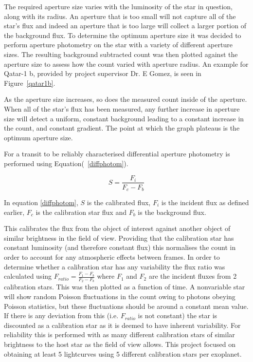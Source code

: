 \documentclass{report}
\begin{document}
The required aperture size varies with the luminosity of the star in question, along with its radius. An aperture that is too small will not capture all of the star's flux and indeed an aperture that is too large will collect a larger portion of the background flux. To determine the optimum aperture size it was decided to perform aperture photometry on the star with a variety of different aperture sizes.  The resulting background subtracted count was then plotted against the aperture size to assess how the count varied with aperture radius. An example for Qatar-1 b, provided by project supervisor Dr. E Gomez, is seen in Figure~\ref{qatar1b}.

As the aperture size increases, so does the measured count inside of the aperture. When all of the star's flux has been measured, any further increase in aperture size will detect a uniform, constant background leading to a constant increase in the count, and constant gradient. The point at which the graph plateaus is the optimum aperture size.

For a transit to be reliably characterised differential aperture photometry is performed using Equation(~\ref{diffphotom}). 

\begin{equation} \label{diffphotom}
    S = \frac{F_{i}}{F_{c}-F_{b}}
\end{equation}

In equation \ref{diffphotom}, $S$ is the calibrated flux, $F_{i}$ is the incident flux as defined earlier, $F_{c}$ is the calibration star flux and $F_{b}$ is the background flux.

This calibrates the flux from the object of interest against another object of similar brightness in the field of view. Providing that the calibration star has constant luminosity (and therefore constant flux) this normalises the count in order to account for any atmospheric effects between frames. In order to determine whether a calibration star has any variability the flux ratio was calculated using $F_{ratio} = \frac{F_{1} - F_{b}}{F_{2}-F_{b}}$ where $F_{1}$ and $F_{2}$ are the incident fluxes from 2 calibration stars. This was then plotted as a function of time. A nonvariable star will show random Poisson fluctuations in the count owing to photons obeying Poisson statistics, but these fluctuations should be around a constant mean value. If there is any deviation from this (i.e. $F_{ratio}$ is not constant) the star is discounted as a calibration star as it is deemed to have inherent variability. For reliability this is performed with as many different calibration stars of similar brightness to the host star as the field of view allows. This project focused on obtaining at least 5 lightcurves using 5 different calibration stars per exoplanet. 
\end{document}

